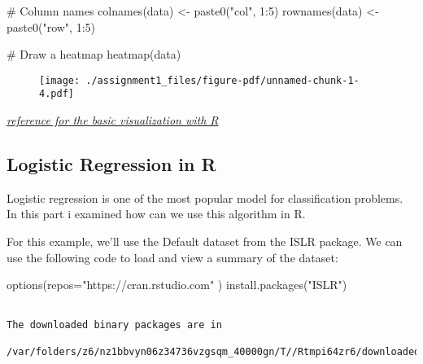 \documentclass[
  letterpaper,
  DIV=11,
  numbers=noendperiod]{scrreprt}
\newenvironment{Shaded}{\begin{snugshade}}{\end{snugshade}}
\newcommand{\AttributeTok}[1]{\textcolor[rgb]{0.40,0.45,0.13}{#1}}
\newcommand{\CommentTok}[1]{\textcolor[rgb]{0.37,0.37,0.37}{#1}}
\newcommand{\DecValTok}[1]{\textcolor[rgb]{0.68,0.00,0.00}{#1}}
\newcommand{\FunctionTok}[1]{\textcolor[rgb]{0.28,0.35,0.67}{#1}}
\newcommand{\NormalTok}[1]{\textcolor[rgb]{0.00,0.23,0.31}{#1}}
\newcommand{\OtherTok}[1]{\textcolor[rgb]{0.00,0.23,0.31}{#1}}
\newcommand{\SpecialCharTok}[1]{\textcolor[rgb]{0.37,0.37,0.37}{#1}}
\newcommand{\StringTok}[1]{\textcolor[rgb]{0.13,0.47,0.30}{#1}}
\begin{document}
\begin{Shaded}
\begin{Highlighting}[]
\CommentTok{\# Column names}
\FunctionTok{colnames}\NormalTok{(data) }\OtherTok{\textless{}{-}} \FunctionTok{paste0}\NormalTok{(}\StringTok{"col"}\NormalTok{, }\DecValTok{1}\SpecialCharTok{:}\DecValTok{5}\NormalTok{)}
\FunctionTok{rownames}\NormalTok{(data) }\OtherTok{\textless{}{-}} \FunctionTok{paste0}\NormalTok{(}\StringTok{"row"}\NormalTok{, }\DecValTok{1}\SpecialCharTok{:}\DecValTok{5}\NormalTok{)}
  
\CommentTok{\# Draw a heatmap}
\FunctionTok{heatmap}\NormalTok{(data)     }
\end{Highlighting}
\end{Shaded}

\begin{figure}[H]

{\centering \texttt{[image: ./assignment1\_files/figure-pdf/unnamed-chunk-1-4.pdf]}

}

\end{figure}

\href{https://www.geeksforgeeks.org/data-visualization-in-r}{\emph{reference
for the basic visualization with R}}

\hypertarget{logistic-regression-in-r}{%
\subsection{Logistic Regression in R}\label{logistic-regression-in-r}}

Logistic regression is one of the most popular model for classification
problems. In this part i examined how can we use this algorithm in R.

For this example, we'll use the Default dataset from the ISLR package.
We can use the following code to load and view a summary of the dataset:

\begin{Shaded}
\begin{Highlighting}[]
\FunctionTok{options}\NormalTok{(}\AttributeTok{repos=}\StringTok{"https://cran.rstudio.com"}\NormalTok{ )}
\FunctionTok{install.packages}\NormalTok{(}\StringTok{"ISLR"}\NormalTok{)}
\end{Highlighting}
\end{Shaded}

\begin{verbatim}

The downloaded binary packages are in
    /var/folders/z6/nz1bbvyn06z34736vzgsqm_40000gn/T//Rtmpi64zr6/downloaded_packages
\end{verbatim}
\end{document}
